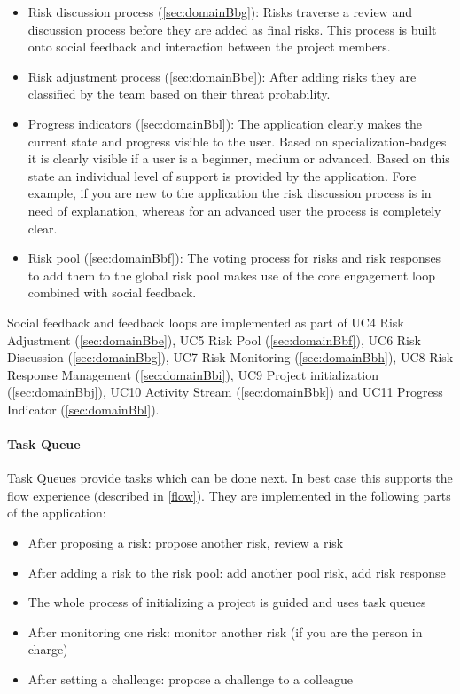 \begin{itemize}
	\item Risk discussion process (\ref{sec:domainBbg}): Risks traverse a review and discussion process before they are added as final risks. This process is built onto social feedback and interaction between the project members.
	\item Risk adjustment process (\ref{sec:domainBbe}): After adding risks they are classified by the team based on their threat probability.
	\item Progress indicators (\ref{sec:domainBbl}): The application clearly makes the current state and progress visible to the user. Based on specialization-badges it is clearly visible if a user is a beginner, medium or advanced. Based on this state an individual level of support is provided by the application. Fore example, if you are new to the application the risk discussion process is in need of explanation, whereas for an advanced user the process is completely clear.
	\item Risk pool (\ref{sec:domainBbf}): The voting process for risks and risk responses to add them to the global risk pool makes use of the core engagement loop combined with social feedback.
\end{itemize}

Social feedback and feedback loops are implemented as part of \ac{UC}4 Risk Adjustment (\ref{sec:domainBbe}), \ac{UC}5 Risk Pool (\ref{sec:domainBbf}), \ac{UC}6 Risk Discussion (\ref{sec:domainBbg}), \ac{UC}7 Risk Monitoring (\ref{sec:domainBbh}), \ac{UC}8 Risk Response Management (\ref{sec:domainBbi}), \ac{UC}9 Project initialization (\ref{sec:domainBbj}), \ac{UC}10 Activity Stream (\ref{sec:domainBbk}) and \ac{UC}11 Progress Indicator (\ref{sec:domainBbl}).

\paragraph*{Task Queue}

Task Queues provide tasks which can be done next. In best case this supports the flow experience (described in \ref{flow}).
They are implemented in the following parts of the application:
\begin{itemize}
	\item After proposing a risk: propose another risk, review a risk
	\item After adding a risk to the risk pool: add another pool risk, add risk response
	\item The whole process of initializing a project is guided and uses task queues
	\item After monitoring one risk: monitor another risk (if you are the person in charge)
	\item After setting a challenge: propose a challenge to a colleague
\end{itemize}

